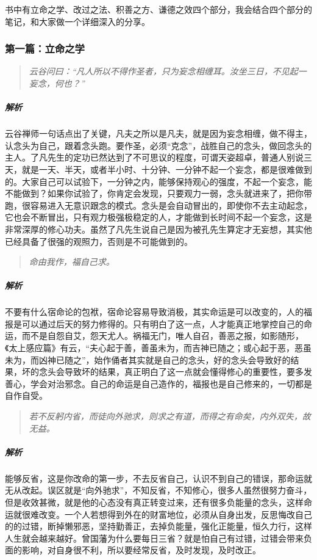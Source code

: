 书中有立命之学、改过之法、积善之方、谦德之效四个部分，我会结合四个部分的笔记，和大家做一个详细深入的分享。

\subsubsection{第一篇：立命之学}

\begin{quote}\it
    云谷问曰：“凡人所以不得作圣者，只为妄念相缠耳。汝坐三日，不见起一妄念，何也？”
\end{quote}

\subparagraph{解析} 云谷禅师一句话点出了关键，凡夫之所以是凡夫，就是因为妄念相缠，做不得主，认念头为自己，跟着念头跑。要作圣，必须“克念”，战胜自己的念头，做回念头的主人。了凡先生的定功已然达到了不可思议的程度，可谓天姿超卓，普通人别说三天，就是一天、半天，或者半小时、十分钟、一分钟不起一个妄念，都是很难做到的。大家自己可以试验下，一分钟之内，能够保持观心的强度，不起一个妄念，能不能做到？如果你试验了，你肯定会发现，只要观力一弱，念头就进来了，把你带跑，很容易进入无意识跟念的模式。念头是会自动冒出的，即使你不去主动起念，它也会不断冒出，只有观力极强极稳定的人，才能做到长时间不起一个妄念，这是非常深厚的修心功夫。虽然了凡先生说自己是因为被孔先生算定才无妄想，其实他已经具备了很强的观照力，否则是不可能做到的。

\begin{quote}\it
    命由我作，福自己求。
\end{quote}

\subparagraph{解析} 不要有什么宿命论的包袱，宿命论容易导致消极，其实命运是可以改变的，人的福报是可以通过后天的努力修得的。只有明白了这一点，人才能真正地掌控自己的命运，而不是自怨自艾，怨天尤人。祸福无门，唯人自召，善恶之报，如影随形，《太上感应篇》有云，“夫心起于善，善虽未为，而吉神已随之；或心起于恶，恶虽未为，而凶神已随之”，始作俑者其实就是自己的念头，好的念头会导致好的结果，坏的念头会导致坏的结果，真正明白了这一点就会懂得修心的重要性，要多发善心，学会对治邪念。自己的命运是自己造作的，福报也是自己修来的，一切都是自作自受。

\begin{quote}\it
    若不反躬内省，而徒向外驰求，则求之有道，而得之有命矣，内外双失，故无益。
\end{quote}

\subparagraph{解析} 能够反省，这是你改命的第一步，不去反省自己，认识不到自己的错误，那命运就无从改起。误区就是“向外驰求”，不知反省，不知修心，很多人虽然很努力奋斗，但是收效甚微，就是他的心态没有真正转变过来，还有很多负能量的念头，这样命运就很难改变。一个人若想得到外在的财富地位，必须从自身出发，反思悔改自己的的过错，断掉懒邪恶，坚持勤善正，去掉负能量，强化正能量，恒久力行，这样人生就会越来越好。曾国藩为什么要每日三省？就是怕自己有过错，过错会带来负面的影响，对自身很不利，所以要经常反省，及时发现，及时改正。

